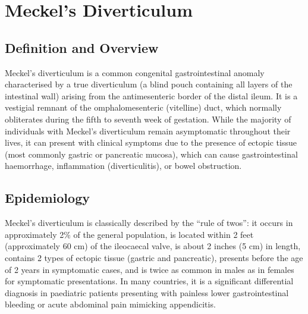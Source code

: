 \chapter{Meckel's Diverticulum}

\section*{Definition and Overview}
Meckel's diverticulum is a common congenital gastrointestinal anomaly characterised by a true diverticulum (a blind pouch containing all layers of the intestinal wall) arising from the antimesenteric border of the distal ileum. It is a vestigial remnant of the omphalomesenteric (vitelline) duct, which normally obliterates during the fifth to seventh week of gestation. While the majority of individuals with Meckel's diverticulum remain asymptomatic throughout their lives, it can present with clinical symptoms due to the presence of ectopic tissue (most commonly gastric or pancreatic mucosa), which can cause gastrointestinal haemorrhage, inflammation (diverticulitis), or bowel obstruction.

\section*{Epidemiology}
Meckel's diverticulum is classically described by the ``rule of twos'': it occurs in approximately 2\% of the general population, is located within 2 feet (approximately 60 cm) of the ileocaecal valve, is about 2 inches (5 cm) in length, contains 2 types of ectopic tissue (gastric and pancreatic), presents before the age of 2 years in symptomatic cases, and is twice as common in males as in females for symptomatic presentations. In many countries, it is a significant differential diagnosis in paediatric patients presenting with painless lower gastrointestinal bleeding or acute abdominal pain mimicking appendicitis.

